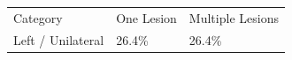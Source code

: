 \begin{tabular}{lll}
Category & One Lesion & Multiple Lesions \\
Left / Unilateral & 26.4\% & 26.4\% \\
\end{tabular}
